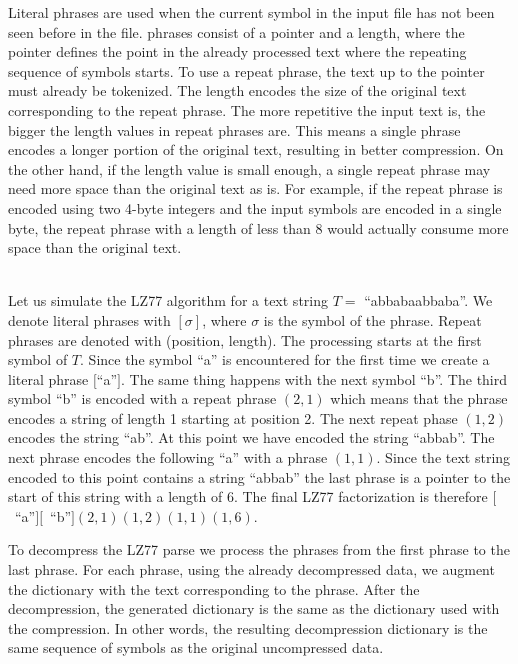 \documentclass[english,twoside,censored,csm,algorithms-track-2020]{HYthesisML}
\theoremstyle{plain}
\theoremstyle{definition}
\begin{document}
Literal phrases are used when the current symbol in the input file has not been seen before in the file.
phrases consist of a pointer and a length, where the pointer defines the point in the already
processed text where the repeating sequence of symbols starts. To use a repeat phrase, the text up
to the pointer must already be tokenized.
The length encodes the size of the original text
corresponding to the repeat phrase. The more repetitive the input text is, the bigger the length
values in repeat phrases are. This means a single phrase encodes a longer portion of the original
text, resulting in better compression. On the other hand, if the length value is small enough,
a single repeat phrase may need more space than the original text as is. For example,
if the repeat phrase is encoded using two 4-byte integers and the input symbols are encoded in a
single byte, the repeat phrase with a length of less than 8 would actually
consume more space than the original text.

\begin{testexample}\\
  Let us simulate the LZ77 algorithm for a text string $T=$ ``abbabaabbaba''. We denote literal phrases
  with $[\sigma]$, where $\sigma$ is the symbol of the phrase. Repeat phrases are denoted
  with (position, length). The processing starts
  at the first symbol of $T$. Since the symbol ``a'' is encountered for the first time we create a
  literal phrase $[$``a''$]$. The same thing happens with the next symbol ``b''. The third symbol ``b'' is
  encoded with a repeat phrase $(2,1)$ which means that the phrase encodes a string of length 1 starting
  at position 2. The next repeat phase $(1,2)$ encodes the string ``ab''. At this point we have encoded
  the string ``abbab''. The next phrase encodes the following ``a'' with a phrase $(1,1)$. Since
  the text string encoded to this point contains a string ``abbab'' the last phrase is a pointer
  to the start of this string with a length of 6. The final LZ77 factorization is therefore
  \hbox{$[$ ``a''$][$ ``b''$](2,1)(1,2)(1,1)(1,6)$.}
\end{testexample}

To decompress the LZ77 parse we process the phrases from the first phrase to the last phrase. For each
phrase, using the already decompressed data, we augment the dictionary with the text corresponding
to the phrase. After the decompression, the generated dictionary is the same as the dictionary used
with the compression. In other words, the resulting decompression dictionary is the same sequence
of symbols as the original uncompressed data. 
\end{document}
